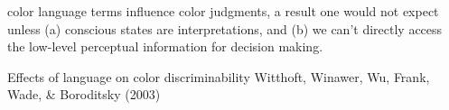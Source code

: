 
 color language terms influence color judgments, a result one would not expect unless (a) conscious states are interpretations, and (b) we can't directly access the low-level perceptual information for decision making.

Effects of language on color discriminability
Witthoft, Winawer, Wu, Frank, Wade, & Boroditsky (2003)
